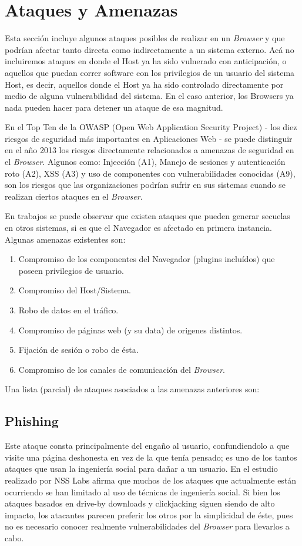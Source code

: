 \section{Ataques y Amenazas}
Esta sección incluye algunos ataques posibles de realizar en un \textit{Browser} y que podrían afectar tanto directa como indirectamente a un sistema externo. Acá no incluiremos ataques en donde el Host ya ha sido vulnerado con anticipación, o aquellos que puedan correr software con los privilegios de un usuario del sistema Host, es decir, aquellos donde el Host ya ha sido controlado directamente por medio de alguna vulnerabilidad del sistema. En el caso anterior, los Browsers ya nada pueden hacer para detener un ataque de esa magnitud.

En el Top Ten \cite{owaspTopTen} de la OWASP (Open Web Application Security Project) - los diez riesgos de seguridad más importantes en Aplicaciones Web - se puede distinguir en el año 2013 los riesgos directamente relacionados a amenazas de seguridad en el \textit{Browser}. Algunos como: Injección (A1), Manejo de sesiones y autenticación roto (A2), XSS (A3) y uso de componentes con vulnerabilidades conocidas (A9), son los riesgos que las organizaciones podrían sufrir en sus sistemas cuando se realizan ciertos ataques en el \textit{Browser}.

En trabajos \cite{barth2008security, FirefoxThreatModel} se puede observar que existen ataques que pueden generar secuelas en otros sistemas, si es que el Navegador es afectado en primera instancia. Algunas amenazas existentes son:

\begin{enumerate}
	\item Compromiso de los componentes del Navegador (plugins incluídos) que poseen privilegios de usuario.
	\item Compromiso del Host/Sistema.
	\item Robo de datos en el tráfico.
	\item Compromiso de páginas web (y su data) de origenes distintos.
	\item Fijación de sesión o robo de ésta.
	\item Compromiso de los canales de comunicación del \textit{Browser}.
\end{enumerate}

Una lista (parcial) de ataques asociados a las amenazas anteriores son:

\subsection{Phishing}
Este ataque consta principalmente del engaño al usuario, confundiendolo a que visite una página deshonesta en vez de la que tenía pensado; es uno de los tantos ataques que usan la ingeniería social para dañar a un usuario. En el estudio realizado por NSS Labs \cite{browSecPhish} afirma que muchos de los ataques que actualmente están ocurriendo se han limitado al uso de técnicas de ingeniería social. Si bien los ataques basados en drive-by downloads y clickjacking siguen siendo de alto impacto, los atacantes parecen preferir los otros por la simplicidad de éste, pues no es necesario conocer realmente vulnerabilidades del \textit{Browser} para llevarlos a cabo. 


